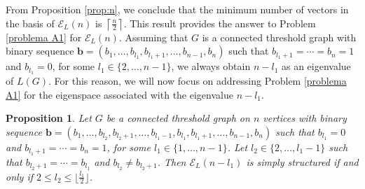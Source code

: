 \documentclass[preprint]{elsarticle}
\newtheorem{proposition}[theorem]{Proposition}
\begin{document}
From Proposition \ref{prop:n}, we conclude that the minimum number of vectors in the basis of $\mathcal{E}_{L}(n)$ is $\left\lceil\frac{n}{2}\right\rceil$. This result provides the answer to Problem \ref{problema A1} for $\mathcal{E}_{L}(n).$ Assuming that $G$ is a connected threshold graph with binary sequence $\mathbf{b}=(b_1, \ldots, b_{l_1}, b_{l_1+1}, \ldots, b_{n-1}, b_n)$ such that $b_{l_1+1}=\cdots=b_{n}=1$ and $b_{l_1}=0$, for some $l_1\in \{2,\ldots, n-1\}$, we always obtain $n-l_1$ as an eigenvalue of $L(G).$ For this reason, we will now focus on addressing Problem \ref{problema A1} for the eigenspace associated with the eigenvalue $n-l_1$. 

\begin{proposition}\label{prop:n-k}
   Let $G$ be a connected threshold graph on $n$ vertices with binary sequence $\mathbf{b}=(b_1, \ldots, b_{l_2}, b_{l_2+1}, \ldots, b_{l_1-1}, b_{l_1}, b_{l_1+1}, \ldots, b_{n-1}, b_{n})$ such that $b_{l_1}=0$ and $b_{l_1+1}=\cdots=b_{n}=1$, for some $l_1 \in \{1,\ldots, n-1\}$. Let $l_2\in \{2, \ldots, l_1-1\}$ such that 
   $b_{l_2+1}=\cdots=b_{l_1}$ and $b_{l_2}\neq b_{l_2+1}$. Then $\mathcal{E}_{L}(n-l_1)$ is simply structured if and only if $2\leq l_2 \leq \lfloor \frac{l_1}{2} \rfloor$.
\end{proposition}
\end{document}
